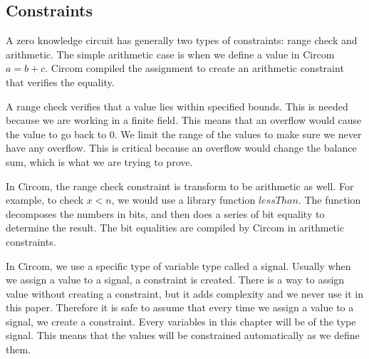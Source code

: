 


\subsection{Constraints} 

A zero knowledge circuit has generally two types of constraints: range check and arithmetic.
The simple arithmetic case is when we define a value in Circom $a = b + c$. Circom compiled the assignment to create an arithmetic constraint that verifies the equality.


A range check verifies that a value lies within specified bounds. This is needed because we are working in a finite field. This means that an overflow would cause the value to go back to 0.
We limit the range of the values to make sure we never have any overflow. This is critical because an overflow would change the balance sum, which is what we are trying to prove.


In Circom, the range check constraint is transform to be arithmetic as well. For example, to check $x<n$, we would use a library function $lessThan$.
The function decomposes the numbers in bits, and then does a series of bit equality to determine the result. The bit equalities are compiled by Circom in arithmetic constraints.


In Circom, we use a specific type of variable type called a signal. Usually when we assign a value to a signal, a constraint is created.
There is a way to assign value without creating a constraint, but it adds complexity and we never use it in this paper. 
Therefore it is safe to assume that every time we assign a value to a signal, we create a constraint. 
Every variables in this chapter will be of the type signal.
This means that the values will be constrained automatically as we define them. 


